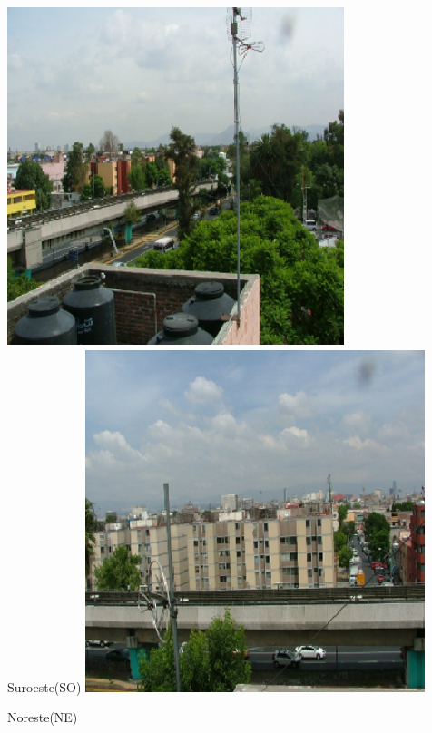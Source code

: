 \documentclass{article}
\begin{document}
\begin{minipage}{0.53\linewidth}
\begin{minipage}{0.23\linewidth}
\includegraphics[scale=0.68]{images/noroeste.eps}\\
\colorbox{ner}{\changefontsizes{9pt} \hspace{0.4cm} Suroeste(SO) \hspace{0.4cm}}
\includegraphics[scale=0.68]{images/suroeste.eps}
\end{minipage}
\begin{minipage}{0.23\linewidth}
\colorbox{ner}{\changefontsizes{9pt} \hspace{0.4cm} Noreste(NE) \hspace{0.4cm}}

\end{minipage}
\end{minipage}
\end{document}
